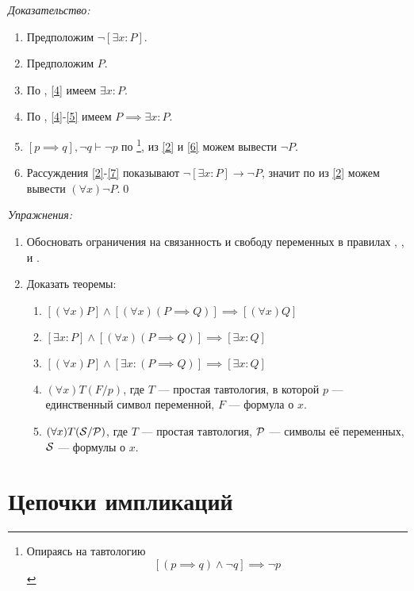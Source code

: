 {\it Доказательство:}
\begin{enumerate}[label=(\arabic*)]
	\item{}\label{2}Предположим $\lnot [\exists x:P]$.
	\item{}\label{4}Предположим $P$.
	\item{}\label{5}По \Eii{}, \ref{4} имеем $\exists x:P$.
	\item{}\label{6}По \implic{}, \ref{4}-\ref{5} имеем
	$P\implies \exists x:P$.
	\item{}\label{7}${[p\implies q],\lnot q\vdash \lnot p}$ по \taut{}\footnote{
		Опираясь на тавтологию
		\[
			[(p\implies q)\land\lnot q]\implies\lnot p
		\]
	}, из
	\ref{2} и \ref{6} можем вывести $\lnot P$.
	\item{}\label{8}Рассуждения \ref{2}-\ref{7} показывают
	$\lnot[\exists x:P]\to\lnot P$, значит по \Aii{} из \ref{2} можем
	вывести $(\forall x)\lnot P$.\qed
\end{enumerate}

\pagebreak
{\it Упражнения:}
\begin{enumerate}
	\item{}Обосновать ограничения на связанность и свободу переменных в правилах
	\Aii{}, \Aee{}, \Eii{} и \Eee{}.
	\item{}\label{ex:obv_thm}Доказать теоремы:
	\begin{enumerate}
		\item{}$[(\forall x)P]\land[(\forall x)(P\implies Q)]
			\implies [(\forall x)Q]$\label{thm:obv_forall}
		\item{}$[\exists x:P]\land[(\forall x)(P\implies Q)]
			\implies [\exists x:Q]$
		\item{}$[(\forall x)P]\land [\exists x:(P\implies Q)]
			\implies [\exists x:Q]$
		\item{}$(\forall x)T(F/p)$, где $T$ --- простая тавтология,
		в которой $p$ --- единственный символ переменной, $F$ --- формула о $x$.
		\item{}$(\forall x)T(\mathcal S/\mathcal P)$, где $T$ --- простая тавтология,
		$\mathcal P$ --- символы её переменных, $\mathcal S$ --- формулы о $x$.\label{thm:obv_taut}
	\end{enumerate}
\end{enumerate}

\section{Цепочки импликаций}


